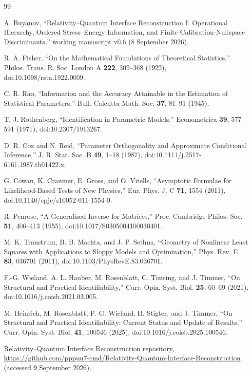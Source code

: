 \begin{thebibliography}{99}

A. Buyanov, ``Relativity--Quantum Interface Reconstruction I: Operational Hierarchy, Ordered Stress--Energy Information, and Finite Calibration-Nullspace Discriminants,'' working manuscript v0.6 (8 September 2026).

R. A. Fisher, ``On the Mathematical Foundations of Theoretical Statistics,'' Philos. Trans. R. Soc. London A \textbf{222}, 309--368 (1922), doi:10.1098/rsta.1922.0009.

C. R. Rao, ``Information and the Accuracy Attainable in the Estimation of Statistical Parameters,'' Bull. Calcutta Math. Soc. \textbf{37}, 81--91 (1945).

T. J. Rothenberg, ``Identification in Parametric Models,'' Econometrica \textbf{39}, 577--591 (1971), doi:10.2307/1913267.

D. R. Cox and N. Reid, ``Parameter Orthogonality and Approximate Conditional Inference,'' J. R. Stat. Soc. B \textbf{49}, 1--18 (1987), doi:10.1111/j.2517-6161.1987.tb01422.x.

G. Cowan, K. Cranmer, E. Gross, and O. Vitells, ``Asymptotic Formulae for Likelihood-Based Tests of New Physics,'' Eur. Phys. J. C \textbf{71}, 1554 (2011), doi:10.1140/epjc/s10052-011-1554-0.

R. Penrose, ``A Generalized Inverse for Matrices,'' Proc. Cambridge Philos. Soc. \textbf{51}, 406--413 (1955), doi:10.1017/S0305004100030401.

M. K. Transtrum, B. B. Machta, and J. P. Sethna, ``Geometry of Nonlinear Least Squares with Applications to Sloppy Models and Optimization,'' Phys. Rev. E \textbf{83}, 036701 (2011), doi:10.1103/PhysRevE.83.036701.

F.-G. Wieland, A. L. Hauber, M. Rosenblatt, C. T\"onsing, and J. Timmer, ``On Structural and Practical Identifiability,'' Curr. Opin. Syst. Biol. \textbf{25}, 60--69 (2021), doi:10.1016/j.coisb.2021.03.005.

M. Heinrich, M. Rosenblatt, F.-G. Wieland, H. Stigter, and J. Timmer, ``On Structural and Practical Identifiability: Current Status and Update of Results,'' Curr. Opin. Syst. Biol. \textbf{41}, 100546 (2025), doi:10.1016/j.coisb.2025.100546.

Relativity--Quantum Interface Reconstruction repository, \url{https://github.com/pppuu7-cmd/Relativity-Quantum-Interface-Reconstruction} (accessed 9 September 2026).

\end{thebibliography}

